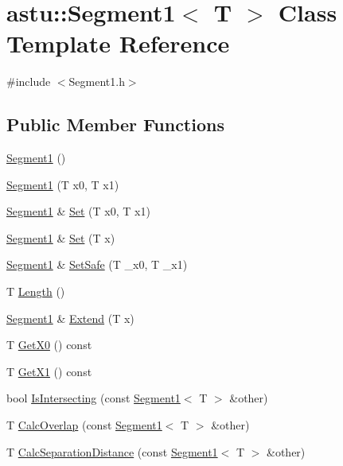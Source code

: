 \hypertarget{classastu_1_1Segment1}{}\section{astu\+:\+:Segment1$<$ T $>$ Class Template Reference}
\label{classastu_1_1Segment1}


{\ttfamily \#include $<$Segment1.\+h$>$}

\subsection*{Public Member Functions}
\begin{DoxyCompactItemize}
\item 
\hyperlink{classastu_1_1Segment1_a259c9cbda64ad57694e33eb5509b52b8}{Segment1} ()
\item 
\hyperlink{classastu_1_1Segment1_a0a1a68b25f64a088e83abb73511c887b}{Segment1} (T x0, T x1)
\item 
\hyperlink{classastu_1_1Segment1}{Segment1} \& \hyperlink{classastu_1_1Segment1_a772bf5f74555481a8e9e8dd562169ae8}{Set} (T x0, T x1)
\item 
\hyperlink{classastu_1_1Segment1}{Segment1} \& \hyperlink{classastu_1_1Segment1_aa7e8932625f352606726e966c1d38ba4}{Set} (T x)
\item 
\hyperlink{classastu_1_1Segment1}{Segment1} \& \hyperlink{classastu_1_1Segment1_abc994f244b4bdf33c979301af2559f84}{Set\+Safe} (T \+\_\+x0, T \+\_\+x1)
\item 
T \hyperlink{classastu_1_1Segment1_aa89676784e95c095b99408437f524d11}{Length} ()
\item 
\hyperlink{classastu_1_1Segment1}{Segment1} \& \hyperlink{classastu_1_1Segment1_a7d71518f6990e41c6103b2a51864d95d}{Extend} (T x)
\item 
T \hyperlink{classastu_1_1Segment1_ac7daaba222bb4669afd375a113a8669e}{Get\+X0} () const
\item 
T \hyperlink{classastu_1_1Segment1_a04f54b79380ec77d7e0f66c4c3ed06b1}{Get\+X1} () const
\item 
bool \hyperlink{classastu_1_1Segment1_a75937f0b835432e56b620b506d61d137}{Is\+Intersecting} (const \hyperlink{classastu_1_1Segment1}{Segment1}$<$ T $>$ \&other)
\item 
T \hyperlink{classastu_1_1Segment1_a329ce84a2bc6a9cfeea1d44495e14d8f}{Calc\+Overlap} (const \hyperlink{classastu_1_1Segment1}{Segment1}$<$ T $>$ \&other)
\item 
T \hyperlink{classastu_1_1Segment1_a414a486080dc65ffce284aea931ddea3}{Calc\+Separation\+Distance} (const \hyperlink{classastu_1_1Segment1}{Segment1}$<$ T $>$ \&other)

\end{DoxyCompactItemize}
